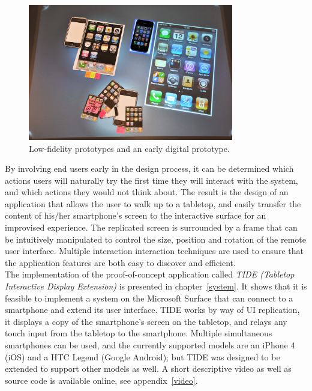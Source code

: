 \begin{figure}[htb]
  \centering
    \includegraphics[width=0.8\textwidth]{images/paperprot2}
  \caption{Low-fidelity prototypes and an early digital prototype.}
  \label{fig:vortex}
\end{figure}

By involving end users early in the design process, it can be determined which actions users will naturally try the first time they will interact with the system, and which actions they would not think about.
The result is the design of an application that allows the user to walk up to a tabletop, and easily transfer the content of his/her smartphone's screen to the interactive surface for an improvised experience.
The replicated screen is surrounded by a frame that can be intuitively manipulated to control the size, position and rotation of the remote user interface.
Multiple interaction interaction techniques are used to ensure that the application features are both easy to discover and efficient.
\\
\linebreak
The implementation of the proof-of-concept application called \emph{TIDE (Tabletop Interactive Display Extension)} is presented in chapter~\ref{system}.
It shows that it is feasible to implement a system on the Microsoft Surface that can connect to a smartphone and extend its user interface.
TIDE works by way of UI replication, it displays a copy of the smartphone's screen on the tabletop, and relays any touch input from the tabletop to the smartphone.
Multiple simultaneous smartphones can be used, and the currently supported models are an iPhone 4 (iOS) and a HTC Legend (Google Android); but TIDE was designed to be extended to support other models as well.
A short descriptive video as well as source code is available online, see appendix~\ref{video}.

